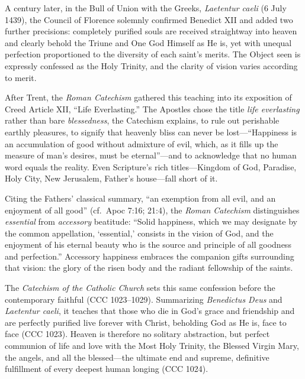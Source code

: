 A century later, in the Bull of Union with the Greeks, \textit{Laetentur caeli} (6 July 1439), the Council of Florence solemnly confirmed Benedict XII and added two further precisions: completely purified souls are received straightway into heaven and clearly behold the Triune and One God Himself as He is, yet with unequal perfection proportioned to the diversity of each saint's merits. The Object seen is expressly confessed as the Holy Trinity, and the clarity of vision varies according to merit.

After Trent, the \textit{Roman Catechism} gathered this teaching into its exposition of Creed Article XII, ``Life Everlasting.'' The Apostles chose the title \textit{life everlasting} rather than bare \textit{blessedness}, the Catechism explains, to rule out perishable earthly pleasures, to signify that heavenly bliss can never be lost---``Happiness is an accumulation of good without admixture of evil, which, as it fills up the measure of man's desires, must be eternal''---and to acknowledge that no human word equals the reality. Even Scripture's rich titles---Kingdom of God, Paradise, Holy City, New Jerusalem, Father's house---fall short of it.

Citing the Fathers' classical summary, ``an exemption from all evil, and an enjoyment of all good'' (cf.\ Apoc 7:16; 21:4), the \textit{Roman Catechism} distinguishes \textit{essential} from \textit{accessory} beatitude: ``Solid happiness, which we may designate by the common appellation, `essential,' consists in the vision of God, and the enjoyment of his eternal beauty who is the source and principle of all goodness and perfection.'' Accessory happiness embraces the companion gifts surrounding that vision: the glory of the risen body and the radiant fellowship of the saints.

The \textit{Catechism of the Catholic Church} sets this same confession before the contemporary faithful (CCC 1023--1029). Summarizing \textit{Benedictus Deus} and \textit{Laetentur caeli}, it teaches that those who die in God's grace and friendship and are perfectly purified live forever with Christ, beholding God as He is, face to face (CCC 1023). Heaven is therefore no solitary abstraction, but perfect communion of life and love with the Most Holy Trinity, the Blessed Virgin Mary, the angels, and all the blessed---the ultimate end and supreme, definitive fulfillment of every deepest human longing (CCC 1024).

